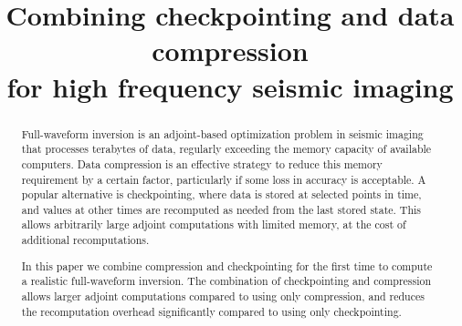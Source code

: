 \documentclass[conference]{IEEEtran}
\begin{document}
\title{Combining checkpointing and data compression\\ for high frequency seismic imaging
}

\author{
\and
{}
\and
{}
\and
{}
\and
{}
\and
{}
}

\maketitle

\begin{abstract}
Full-waveform inversion is an adjoint-based optimization problem in seismic
imaging that processes terabytes of data, regularly exceeding the memory
capacity of available computers. Data compression is an effective strategy to
reduce this memory requirement by a certain factor, particularly if some loss in
accuracy is acceptable. A popular alternative is checkpointing, where data is
stored at selected points in time, and values at other times are recomputed as
needed from the last stored state.  This allows arbitrarily large adjoint
computations with limited memory, at the cost of additional recomputations.

In this paper we combine compression and checkpointing for the first
time to compute a realistic full-waveform inversion. The combination of
checkpointing and compression allows
larger adjoint computations compared to using only compression, and
reduces the recomputation overhead significantly compared to using only checkpointing.
\end{abstract}
\end{document}
